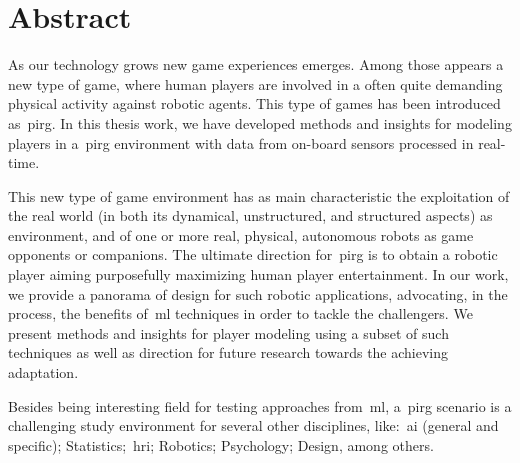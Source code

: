 \chapter*{Abstract}

As our technology grows new game experiences emerges. Among those appears a new type of game, where human players are involved in a often quite demanding physical activity against robotic agents. This type of games has been introduced as~\gls{pirg}. In this thesis work, we have developed methods and insights for modeling players in a~\gls{pirg} environment with data from on-board sensors processed in real-time.

This new type of game environment has as main characteristic the exploitation of the real world (in both its dynamical, unstructured, and structured aspects) as environment, and of one or more real, physical, autonomous robots as game opponents or companions. The ultimate direction for~\gls{pirg} is to obtain a robotic player aiming purposefully maximizing human player entertainment. In our work, we provide a panorama of design for such robotic applications, advocating, in the process, the benefits of~\gls{ml} techniques in order to tackle the challengers. We present methods and insights for player modeling using a subset of such techniques as well as direction for future research towards the achieving adaptation.

Besides being interesting field for testing approaches from~\glsdesc{ml}, a~\gls{pirg} scenario is a challenging study environment for several other disciplines, like:~\gls{ai} (general and specific); Statistics;~\gls{hri}; Robotics; Psychology; Design, among others.



